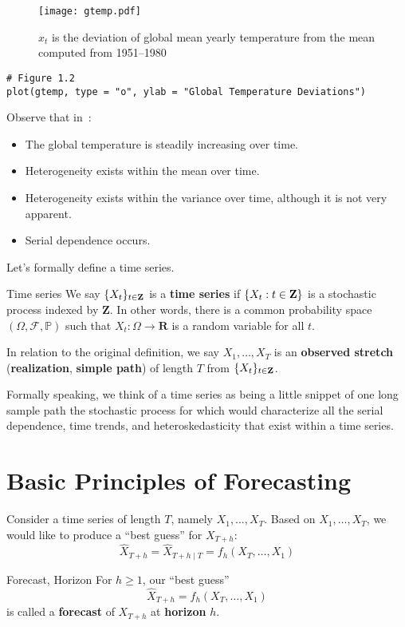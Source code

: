 \begin{figure}[!htbp]
    \centering
    \texttt{[image: gtemp.pdf]}
    \caption{$ x_t $ is the deviation of global mean
        yearly temperature from the mean computed from 1951--1980}\label{fig:gtemp}
\end{figure}
\begin{verbatim}
# Figure 1.2
plot(gtemp, type = "o", ylab = "Global Temperature Deviations")
\end{verbatim}
Observe that in~:
\begin{itemize}
    \item The global temperature is steadily increasing over time.
    \item Heterogeneity exists within the mean over time.
    \item Heterogeneity exists within the variance over time, although it is not very apparent.
    \item Serial dependence occurs.
\end{itemize}
Let's formally define a time series.
\begin{Definition}{Time series}{}
    We say $ \{X_t\}_{t\in\mathbf{Z}} $
    is a \textbf{time series} if $ \{X_t : t\in\mathbf{Z}\} $
    is a stochastic process indexed by $ \mathbf{Z} $.
    In other words, there is a common probability space
    $ (\Omega,\mathcal{F},\mathbb{P}) $ such that
    $ X_t:\Omega\to\mathbf{R} $ is a random variable
    for all $ t $.

    In relation to the original definition, we say
    $ X_1,\ldots,X_T $ is an \textbf{observed stretch} (\textbf{realization},
    \textbf{simple path}) of length $ T $ from $ \{X_t\}_{t\in\mathbf{Z}} $.
\end{Definition}
{\color{blue}Formally speaking, we think of a time series as being a little snippet
of one long sample path the stochastic process for which would characterize
all the serial dependence, time trends, and heteroskedasticity
that exist within a time series.}

\section{Basic Principles of Forecasting}
Consider a time series of length $ T $, namely $ X_1,\ldots,X_T $.
Based on $ X_1,\ldots,X_T $, we would like to produce a ``best guess''
for $ X_{T+h} $:
\[ \hat{X}_{T+h}=\hat{X}_{T+h\mid T}=f_h(X_T,\ldots,X_1) \]
\begin{Definition}{Forecast, Horizon}{}
    For $ h\ge 1 $, our ``best guess''
    \[ \hat{X}_{T+h}=f_h(X_T,\ldots,X_1) \]
    is called a \textbf{forecast} of $ X_{T+h} $
    at \textbf{horizon} $ h $.
\end{Definition}
